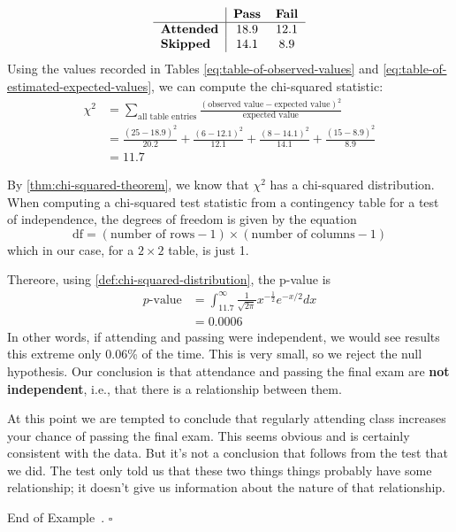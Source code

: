 \documentclass[10pt]{article}
\theoremstyle{definition}
\newtheorem{example}[theorem]{Example}
\renewenvironment{example}
{\begin{oldexample}}
  {\par\smallskip\hfill   End of Example~\theexample. $\square$    \par\end{oldexample}}
\newcommand{\1}[1]{\textbf{1}_{\left[#1\right]}} %
\begin{document}
\begin{example}[Test of independence]
\begin{equation}\label{eq:table-of-estimated-expected-values}
  \begin{tabular}{l|cc}
    & \textbf{Pass} & \textbf{Fail} \\
    \hline
    \textbf{Attended} & $18.9$          & $12.1$            \\
    \textbf{Skipped}  & $14.1$           & $8.9$            
  \end{tabular}
\end{equation}
Using the values recorded in Tables \ref{eq:table-of-observed-values} and
\ref{eq:table-of-estimated-expected-values}, we can compute the chi-squared
statistic:
\begin{align*}
  \chi^{2} 
  &= \sum_{\text{all table entries}} \frac{\left( \text{observed
    value} - \text{expected value} \right)^{2} }{ \text{expected value}} \\
  &= \frac{\left( 25-18.9 \right)^{2} }{20.2}+ \frac{(6-12.1)^{2}}{12.1}+ \frac{\left( 8-14.1 \right)^{2} }{14.1}+ \frac{\left( 15-8.9 \right)^{2} }{8.9}\\
  &= 11.7
\end{align*}

By \cref{thm:chi-squared-theorem}, we know that $\chi^{2}$ has a chi-squared
distribution. When computing a chi-squared test statistic from a contingency
table for a test of independence, the degrees of freedom is given by the
equation
\begin{equation*}
  \text{df}=(\text{number of rows} -1)\times (\text{number of columns} -1)
\end{equation*}
which in our case, for a $2\times 2$ table, is just 1.

Thereore, using \cref{def:chi-squared-distribution}, the p-value is
\begin{align*}
  p \text{-value} 
  &= \int_{11.7}^{\infty} \frac{1}{\sqrt{2\pi}} x^{-\frac{1}{2}}e^{-x/2}dx\\
  &=0.0006
\end{align*}
In other words, if attending and passing were independent, we would see
results this extreme only 0.06\% of the time. This is very small, so we reject
the null hypothesis. Our conclusion is that attendance and passing the final
exam are \textbf{not independent}, i.e., that there is a relationship between
them.

At this point we are tempted to conclude that regularly attending class
increases your chance of passing the final exam. This seems obvious and is
certainly consistent with the data. But it's not a conclusion that follows
from the test that we did. The test only told us that these two things things
probably have some relationship; it doesn't give us information about the
nature of that relationship.
\end{example}
\end{document}
